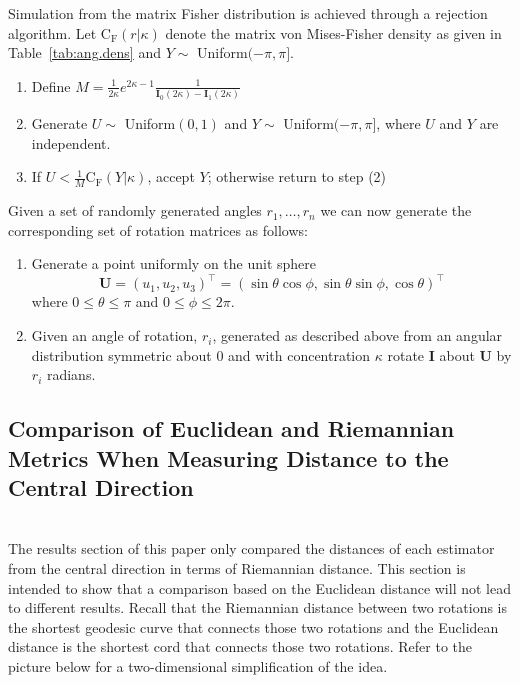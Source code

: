 Simulation from the matrix Fisher distribution is achieved through a rejection algorithm.  Let  $\mathrm{C_F}(r|\kappa)$ denote the matrix von Mises-Fisher density as given in Table~\ref{tab:ang.dens} and $Y\sim$ Uniform$(-\pi,\pi]$.

\begin{enumerate}
\item Define $M=\frac{1}{2\kappa}e^{2\kappa - 1}\frac{1}{\mathbf{I}_0(2\kappa)-\mathbf{I}_1(2\kappa)}$
\item Generate $U\sim$ Uniform$(0,1)$ and $Y\sim$ Uniform$(-\pi,\pi]$, where $U$ and $Y$ are independent.
\item If $U<\frac{1}{M}\mathrm{C_F}(Y|\kappa)$, accept $Y$; otherwise return to step (2)
\end{enumerate}

Given a set of randomly generated angles $r_1,\ldots, r_n$ we can now generate the corresponding set of rotation matrices as follows:
\begin{enumerate}
\item Generate a point uniformly on the unit sphere
$$\bm{U}=(u_1,u_2,u_3)^\top=(\sin\theta\cos\phi,\sin\theta\sin\phi,\cos\theta)^\top$$
where  $0\leq \theta\leq \pi$ and $0\leq \phi\leq 2\pi$.
\item Given an angle of rotation, $r_i$, generated as described above from an angular distribution symmetric about 0 and with concentration $\kappa$ rotate $\bm{I}$ about $\bm{U}$ by $r_i$ radians.
\end{enumerate}

\subsection{Comparison of Euclidean and Riemannian Metrics When Measuring Distance to the Central Direction}\hfill\\

The results section of this paper only compared the distances of each estimator from the central direction in terms of Riemannian distance.  This section is intended to show that a comparison based on the Euclidean distance will not lead to different results.  Recall that the Riemannian distance between two rotations is the shortest geodesic curve that connects those two rotations and the Euclidean distance is the shortest cord that connects those two rotations.  Refer to the picture below for a two-dimensional simplification of the idea.


